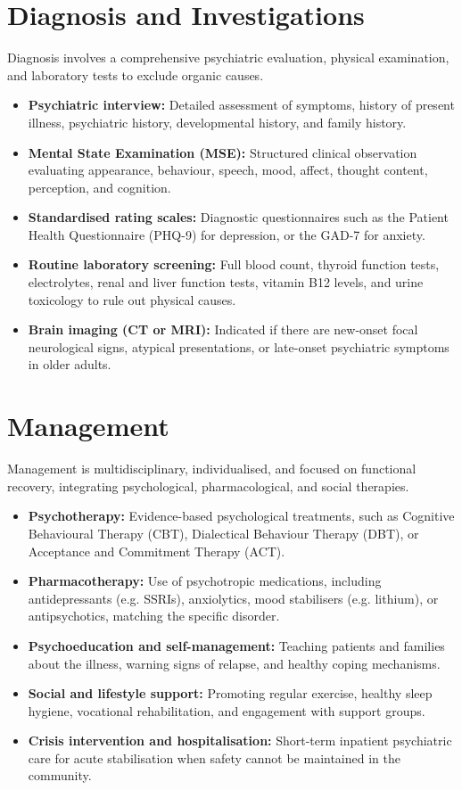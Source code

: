 \section*{Diagnosis and Investigations}
Diagnosis involves a comprehensive psychiatric evaluation, physical examination, and laboratory tests to exclude organic causes.
\begin{itemize}
    \item \textbf{Psychiatric interview:} Detailed assessment of symptoms, history of present illness, psychiatric history, developmental history, and family history.
    \item \textbf{Mental State Examination (MSE):} Structured clinical observation evaluating appearance, behaviour, speech, mood, affect, thought content, perception, and cognition.
    \item \textbf{Standardised rating scales:} Diagnostic questionnaires such as the Patient Health Questionnaire (PHQ-9) for depression, or the GAD-7 for anxiety.
    \item \textbf{Routine laboratory screening:} Full blood count, thyroid function tests, electrolytes, renal and liver function tests, vitamin B12 levels, and urine toxicology to rule out physical causes.
    \item \textbf{Brain imaging (CT or MRI):} Indicated if there are new-onset focal neurological signs, atypical presentations, or late-onset psychiatric symptoms in older adults.
\end{itemize}

\section*{Management}
Management is multidisciplinary, individualised, and focused on functional recovery, integrating psychological, pharmacological, and social therapies.
\begin{itemize}
    \item \textbf{Psychotherapy:} Evidence-based psychological treatments, such as Cognitive Behavioural Therapy (CBT), Dialectical Behaviour Therapy (DBT), or Acceptance and Commitment Therapy (ACT).
    \item \textbf{Pharmacotherapy:} Use of psychotropic medications, including antidepressants (e.g. SSRIs), anxiolytics, mood stabilisers (e.g. lithium), or antipsychotics, matching the specific disorder.
    \item \textbf{Psychoeducation and self-management:} Teaching patients and families about the illness, warning signs of relapse, and healthy coping mechanisms.
    \item \textbf{Social and lifestyle support:} Promoting regular exercise, healthy sleep hygiene, vocational rehabilitation, and engagement with support groups.
    \item \textbf{Crisis intervention and hospitalisation:} Short-term inpatient psychiatric care for acute stabilisation when safety cannot be maintained in the community.
\end{itemize}

